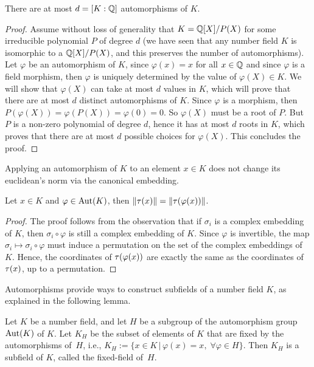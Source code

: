 \begin{lemma}
\label{lemma:upper-bound-automorphisms}
There are at most $d = [K:\mathbb{Q}]$ automorphisms of $K$.
\end{lemma}

\begin{proof}
Assume without loss of generality that $K = \mathbb{Q}[X]/P(X)$ for some irreducible polynomial $P$ of degree $d$ (we have seen that any number field $K$ is isomorphic to a $\mathbb{Q}[X]/P(X)$, and this preserves the number of automorphisms). Let $\varphi$ be an automorphism of $K$, since $\varphi(x) = x$ for all $x \in \mathbb{Q}$ and since $\varphi$ is a field morphism, then $\varphi$ is uniquely determined by the value of $\varphi(X) \in K$. We will show that $\varphi(X)$ can take at most $d$ values in $K$, which will prove that there are at most $d$ distinct automorphisms of $K$.
Since $\varphi$ is a morphism, then $P(\varphi(X)) = \varphi(P(X)) = \varphi(0) = 0$. So $\varphi(X)$ must be a root of $P$. But $P$ is a non-zero polynomial of degree $d$, hence it has at most $d$ roots in $K$, which proves that there are at most $d$ possible choices for $\varphi(X)$. This concludes the proof.
\end{proof}

Applying an automorphism of $K$ to an element $x \in K$ does not change its euclidean's norm via the canonical embedding.
\begin{lemma}
\label{lemma:automorphism-preserves-size}
Let $x \in K$ and $\varphi \in \operatorname{Aut}(K)$, then $\|\tau(x)\| = \|\tau(\varphi(x))\|$.
\end{lemma}
\begin{proof}
The proof follows from the observation that if $\sigma_i$ is a complex embedding of $K$, then $\sigma_i \circ \varphi$ is still a complex embedding of $K$. Since $\varphi$ is invertible, the map $\sigma_i \mapsto \sigma_i \circ \varphi$ must induce a permutation on the set of the complex embeddings of $K$. Hence, the coordinates of $\tau(\varphi(x))$ are exactly the same as the coordinates of $\tau(x)$, up to a permutation.
\end{proof}

Automorphisms provide ways to construct subfields of a number field $K$, as explained in the following lemma.
\begin{lemma}
Let $K$ be a number field, and let $H$ be a subgroup of the automorphism group $\operatorname{Aut}(K)$ of $K$. Let $K_H$ be the subset of elements of $K$ that are fixed by the automorphisms of~$H$, i.e., $K_H := \{ x \in K \,|\, \varphi(x) = x, \; \forall \varphi \in H\}$. Then $K_H$ is a subfield of $K$, called the fixed-field of~$H$.
\end{lemma}

